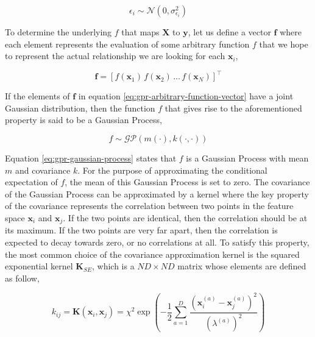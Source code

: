 \begin{spacing}{2.0}
    \begin{equation}
        \epsilon_i \sim \mathcal{N}(0,\sigma_{\epsilon_i}^2)
    \end{equation}

    To determine the underlying $f$ that maps $\mathbf{X}$ to $\mathbf{y}$, let us define a vector $\mathbf{f}$ where each element represents the 
    evaluation of some arbitrary function $f$ that we hope to represent the actual relationship we are looking for each $\mathbf{x}_i$,

    \begin{equation}
        \mathbf{f} = \left[f(\mathbf{x}_1)\,f(\mathbf{x}_2)\,\ldots\,f(\mathbf{x}_N)\right]^{\top}
        \label{eq:gpr-arbitrary-function-vector}
    \end{equation}

    If the elements of $\mathbf{f}$ in equation \ref{eq:gpr-arbitrary-function-vector} have a joint Gaussian distribution, then the function $f$
    that gives rise to the aforementioned property is said to be a Gaussian Process,

    \begin{equation}
        f \sim \mathcal{GP}\left(m(\cdot),k(\cdot,\cdot)\right)
        \label{eq:gpr-gaussian-process}
    \end{equation}

    Equation \ref{eq:gpr-gaussian-process} states that $f$ is a Gaussian Process with mean $m$ and covariance $k$. For the purpose of approximating 
    the conditional expectation of $f$, the mean of this Gaussian Process is set to zero. The covariance of the Gaussian Process can be approximated 
    by a kernel where the key property of the covariance represents the correlation between two points in the feature space $\mathbf{x}_i$ and 
    $\mathbf{x}_j$. If the two points are identical, then the correlation should be at its maximum. If the two points are very far apart, then the 
    correlation is expected to decay towards zero, or no correlations at all. To satisfy this property, the most common choice of the covariance 
    approximation kernel is the squared exponential kernel $\mathbf{K}_{SE}$, which is a $ND \times ND$ matrix whose elements are defined as follow,

    \begin{equation}
        k_{ij} = \mathbf{K}(\mathbf{x}_i,\mathbf{x}_j) = \chi^2\exp\left(-\frac{1}{2}\sum_{a=1}^D\frac{\left(\mathbf{x}_i^{(a)} - 
            \mathbf{x}_j^{(a)}\right)^2}{{(\lambda^{(a)})}^2}\right)
        \label{eq:gpr-covariance-matrix}
    \end{equation}


\end{spacing}
